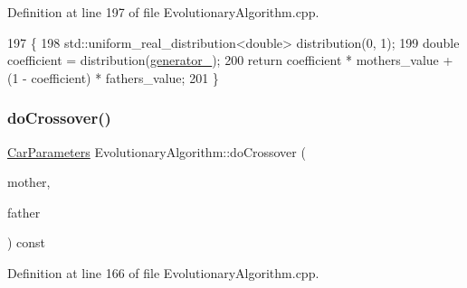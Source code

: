 Definition at line 197 of file Evolutionary\+Algorithm.\+cpp.


\begin{DoxyCode}
197                                                                                           \{
198     std::uniform\_real\_distribution<double> distribution(0, 1);
199     \textcolor{keywordtype}{double} coefficient = distribution(\hyperlink{classEvolutionaryAlgorithm_adbd823d385ad95bf20496fd2fc25ccde}{generator\_});
200     \textcolor{keywordflow}{return} coefficient * mothers\_value + (1 - coefficient) * fathers\_value;
201 \}
\end{DoxyCode}
\mbox{\label{classEvolutionaryAlgorithm_a387fba63cd849a74652c6de1beb82318}} 
\subsubsection{\texorpdfstring{do\+Crossover()}{doCrossover()}\hspace{0.1cm}{\footnotesize\ttfamily [2/2]}}
{\footnotesize\ttfamily \hyperlink{classCarParameters}{Car\+Parameters} Evolutionary\+Algorithm\+::do\+Crossover (\begin{DoxyParamCaption}\item[{const \hyperlink{classCarParameters}{Car\+Parameters} \&}]{mother,  }\item[{const \hyperlink{classCarParameters}{Car\+Parameters} \&}]{father }\end{DoxyParamCaption}) const\hspace{0.3cm}{\ttfamily [private]}}



Definition at line 166 of file Evolutionary\+Algorithm.\+cpp.


